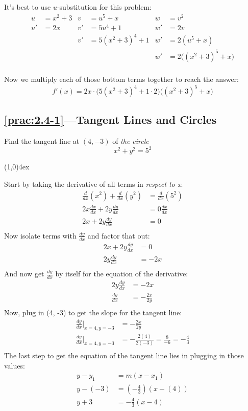 \documentclass{MathNotes}
\newcommand{\br}{
\begin{center}
\line(1,0){4ex}
\end{center}}
\begin{document}
It's best to use $u$-substitution for this problem:
\begin{align*}
    u&=x^2+3 & v&=u^5+x & w&=v^2\\
    u'&=2x & v'&=5u^4+1 & w'&=2v\\
     && v'&=5(x^2+3)^4+1 & w'&=2(u^5+x)\\
     && && w'&=2\big((x^2+3)^5+x\big)\\
\end{align*}

Now we multiply each of those bottom terms together to reach the answer:
$$f'(x)=2x\cdot\big(5(x^2+3)^4+1\cdot2\big)\big((x^2+3)^5+x\big)$$

\subsection*{\ref{prac:2.4-1}---Tangent Lines and Circles}\label{ans:2.4-1}
Find the tangent line at $(4,-3)$ of \textit{the circle}
$$x^2+y^2=5^2$$
\br
Start by taking the derivative of all terms in \textit{respect to x}:
\begin{align*}
    \frac{d}{dx}(x^2)+\frac{d}{dx}(y^2)&=\frac{d}{dx}(5^2)\\
    2x\frac{dx}{dx}+2y\frac{dy}{dx}&=0\frac{dx}{dx}\\
    2x+2y\frac{dy}{dx}&=0\\
\end{align*}
Now isolate terms with $\frac{dy}{dx}$ and factor that out:
\begin{align*}
    2x+2y\frac{dy}{dx}&=0\\
    2y\frac{dy}{dx}&=-2x\\
\end{align*}
And now get $\frac{dy}{dx}$ by itself for the equation of the derivative:
\begin{align*}
    2y\frac{dy}{dx}&=-2x\\
    \frac{dy}{dx}&=-\frac{2x}{2y}\\
\end{align*}
Now, plug in (4, -3) to get the slope for the tangent line:
\begin{align*}
    \frac{dy}{dx}\Big|_{x=4,y=-3}&=-\frac{2x}{2y}\\
    \frac{dy}{dx}\Big|_{x=4,y=-3}&=-\frac{2(4)}{2(-3)}=\frac{8}{-6}=-\frac{4}{3}\\
\end{align*}
The last step to get the equation of the tangent line lies in plugging in those
values:
\begin{align*}
    y-y_1&=m(x-x_1)\\
    y-(-3)&=(-\frac{4}{3})(x-(4))\\
    y+3&=-\frac{4}{3}(x-4)\\
\end{align*}
\end{document}
